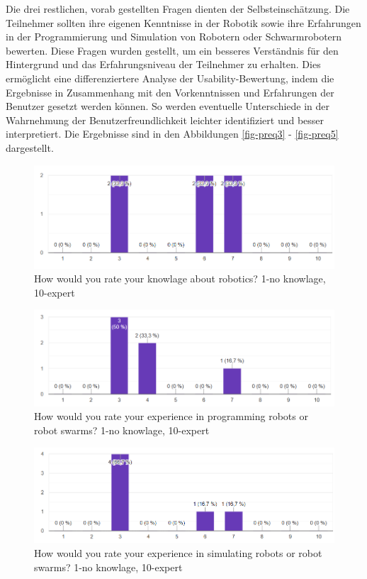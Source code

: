 \documentclass[german,version-2020-11]{uzl-thesis}
\begin{document}
  Die drei restlichen, vorab gestellten Fragen dienten der Selbsteinschätzung. 
  Die Teilnehmer sollten ihre eigenen Kenntnisse in der Robotik sowie ihre Erfahrungen in der Programmierung und Simulation von Robotern oder Schwarmrobotern bewerten. 
  Diese Fragen wurden gestellt, um ein besseres Verständnis für den Hintergrund und das Erfahrungsniveau der Teilnehmer zu erhalten. 
  Dies ermöglicht eine differenziertere Analyse der Usability-Bewertung, indem die Ergebnisse in 
  Zusammenhang mit den Vorkenntnissen und Erfahrungen der Benutzer gesetzt werden können. 
  So werden eventuelle Unterschiede in der Wahrnehmung der Benutzerfreundlichkeit leichter identifiziert und besser interpretiert.
  Die Ergebnisse sind in den Abbildungen \vref{fig-preq3} - \vref{fig-preq5} dargestellt.
  
  \begin{figure}[htpb]
    \centering
    \includegraphics[scale=0.8]{figures/pre_question3.png}
    \caption{How would you rate your knowlage about robotics? 1-no knowlage, 10-expert}
    \label{fig-preq3}
  \end{figure}

  
  \begin{figure}[htpb]
    \centering
    \includegraphics[scale=0.8]{figures/pre_question4.png}
    \caption{How would you rate your experience in programming robots or robot swarms? 1-no knowlage, 10-expert}
    \label{fig-preq4}
  \end{figure}


  \begin{figure}[htpb]
    \centering
    \includegraphics[scale=0.8]{figures/pre_question5.png}
    \caption{How would you rate your experience in simulating robots or robot swarms? 1-no knowlage, 10-expert}
    \label{fig-preq5}
  \end{figure}
\end{document}
